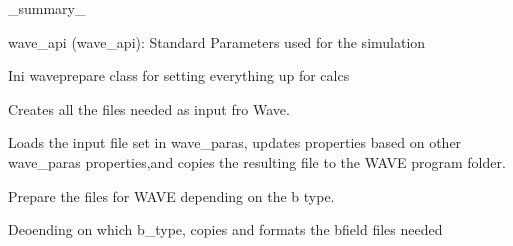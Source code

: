 \documentclass[letterpaper,10pt,english]{sphinxmanual}
\begin{document}
\begin{fulllineitems}
\label{\detokenize{autoapi/unduwave/index:unduwave.wave_prepare}}
\pysigstartsignatures
{}
\pysigstopsignatures
\sphinxAtStartPar
\_summary\_
\begin{description}
\sphinxAtStartPar
wave\_api (wave\_api): Standard Parameters used for the simulation

\end{description}

\sphinxAtStartPar
Ini wave\sphinxhyphen{}prepare class for setting everything up for calcs

\begin{fulllineitems}
\label{\detokenize{autoapi/unduwave/index:unduwave.wave_prepare.create_wave_input}}
\pysigstartsignatures
{}
\pysigstopsignatures
\sphinxAtStartPar
Creates all the files needed as input fro Wave.

\sphinxAtStartPar
Loads the input file set in wave\_paras, updates properties
based on other wave\_paras properties,and copies the
resulting file to the WAVE program folder.

\end{fulllineitems}


\begin{fulllineitems}
\label{\detokenize{autoapi/unduwave/index:unduwave.wave_prepare.prepare_b_files_for_wave}}
\pysigstartsignatures
{}
\pysigstopsignatures
\sphinxAtStartPar
Prepare the files for WAVE depending on the b type.

\sphinxAtStartPar
Deoending on which b\_type, copies and
formats the b\sphinxhyphen{}field files needed

\end{fulllineitems}


\end{fulllineitems}
\end{document}
